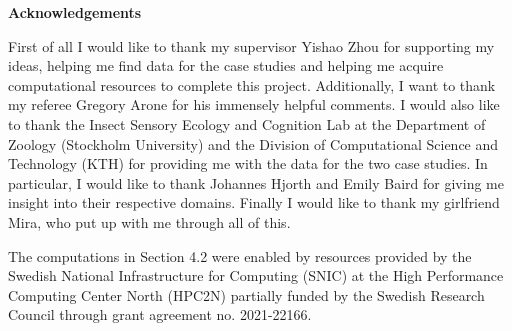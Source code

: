 \newenvironment{acknowledgements}%
    {\cleardoublepage\thispagestyle{empty}\null\vfill\begin{center}%
    \bfseries Acknowledgements\end{center}}%
    {\vfill\null}
        \begin{acknowledgements}
          First of all I would like to thank my supervisor Yishao Zhou for supporting my ideas, helping me find data for the case studies and helping me acquire computational resources to complete this project. Additionally, I want to thank my referee Gregory Arone for his immensely helpful comments. I would also like to thank the Insect Sensory Ecology and Cognition Lab at the Department of Zoology (Stockholm University) and the Division of Computational Science and Technology (KTH) for providing me with the data for the two case studies. In particular, I would like to thank Johannes Hjorth and Emily Baird for giving me insight into their respective domains. Finally I would like to thank my girlfriend Mira, who put up with me through all of this.

          The computations in Section 4.2 were enabled by resources provided by the Swedish National Infrastructure for Computing (SNIC) at the High Performance Computing Center North (HPC2N) partially funded by the Swedish Research Council through grant agreement no. 2021-22166.
        \end{acknowledgements}
